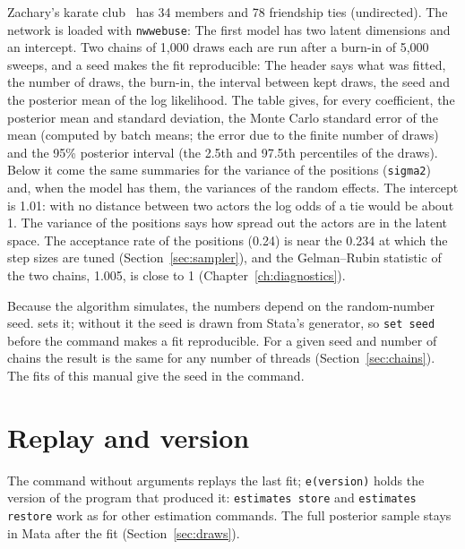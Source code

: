 Zachary's karate club~\cite{zachary1977} has 34 members and 78 friendship ties (undirected). The network is loaded with \texttt{nwwebuse}:
The first model has two latent dimensions and an intercept. Two chains of 1,000 draws each are run after a burn-in of 5,000 sweeps, and a seed makes the fit reproducible:
The header says what was fitted, the number of draws, the burn-in, the interval between kept draws, the seed and the posterior mean of the log likelihood. The table gives, for every coefficient, the posterior mean and standard deviation, the Monte Carlo standard error of the mean (computed by batch means; the error due to the finite number of draws) and the 95\% posterior interval (the 2.5th and 97.5th percentiles of the draws). Below it come the same summaries for the variance of the positions (\texttt{sigma2}) and, when the model has them, the variances of the random effects. The intercept is 1.01: with no distance between two actors the log odds of a tie would be about 1. The variance of the positions says how spread out the actors are in the latent space. The acceptance rate of the positions (0.24) is near the 0.234 at which the step sizes are tuned (Section~\ref{sec:sampler}), and the Gelman--Rubin statistic of the two chains, 1.005, is close to 1 (Chapter~\ref{ch:diagnostics}).

Because the algorithm simulates, the numbers depend on the random-number seed.  sets it; without it the seed is drawn from Stata's generator, so \texttt{set seed} before the command makes a fit reproducible. For a given seed and number of chains the result is the same for any number of threads (Section~\ref{sec:chains}). The fits of this manual give the seed in the command.

\section{Replay and version}

The command without arguments replays the last fit; \texttt{e(version)} holds the version of the program that produced it:
\texttt{estimates store} and \texttt{estimates restore} work as for other estimation commands. The full posterior sample stays in Mata after the fit (Section~\ref{sec:draws}).
